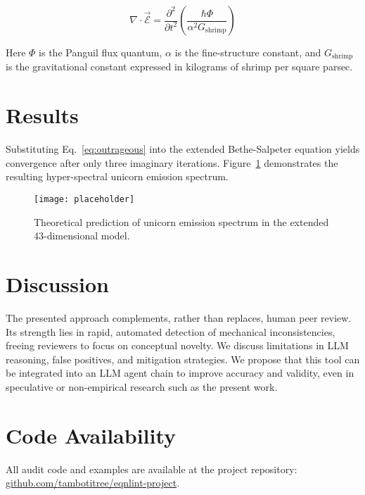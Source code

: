 \documentclass[aps,prl,twocolumn,superscriptaddress,nofootinbib]{revtex4-2}
\begin{document}
\begin{equation}
\label{eq:outrageous}
 \nabla \cdot \vec{\mathcal{E}} = \frac{\partial^2}{\partial t^2} \left( \frac{\hbar\Phi}{\alpha^2 G_{\mathrm{shrimp}}} \right)
\end{equation}

Here $\Phi$ is the Panguil flux quantum, $\alpha$ is the fine-structure constant, and $G_{\mathrm{shrimp}}$ is the gravitational constant expressed in kilograms of shrimp per square parsec.

\section{Results}
Substituting Eq.~\eqref{eq:outrageous} into the extended Bethe-Salpeter equation yields convergence after only three imaginary iterations.  
Figure~\ref{fig:unicornplot} demonstrates the resulting hyper-spectral unicorn emission spectrum.

\begin{figure}[b]
\centering
\texttt{[image: placeholder]}
\caption{Theoretical prediction of unicorn emission spectrum in the extended 43-dimensional model.}
\label{fig:unicornplot}
\end{figure}

\section{Discussion}
The presented approach complements, rather than replaces, human peer review.
Its strength lies in rapid, automated detection of mechanical inconsistencies, freeing reviewers to focus on conceptual novelty.
We discuss limitations in LLM reasoning, false positives, and mitigation strategies.
We propose that this tool can be integrated into an LLM agent chain to improve accuracy and validity, even in speculative or non-empirical research such as the present work.

\appendix
\section{Code Availability}
\label{appendix:code}
All audit code and examples are available at the project repository:
\href{https://github.com/tambotitree/eqnlint-project}{github.com/tambotitree/eqnlint-project}.



\end{document}
